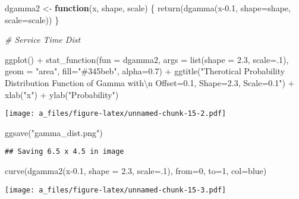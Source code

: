 \documentclass[
]{article}
\newenvironment{Shaded}{\begin{snugshade}}{\end{snugshade}}
\newcommand{\AttributeTok}[1]{\textcolor[rgb]{0.77,0.63,0.00}{#1}}
\newcommand{\CommentTok}[1]{\textcolor[rgb]{0.56,0.35,0.01}{\textit{#1}}}
\newcommand{\ControlFlowTok}[1]{\textcolor[rgb]{0.13,0.29,0.53}{\textbf{#1}}}
\newcommand{\DecValTok}[1]{\textcolor[rgb]{0.00,0.00,0.81}{#1}}
\newcommand{\FloatTok}[1]{\textcolor[rgb]{0.00,0.00,0.81}{#1}}
\newcommand{\FunctionTok}[1]{\textcolor[rgb]{0.00,0.00,0.00}{#1}}
\newcommand{\NormalTok}[1]{#1}
\newcommand{\OtherTok}[1]{\textcolor[rgb]{0.56,0.35,0.01}{#1}}
\newcommand{\SpecialCharTok}[1]{\textcolor[rgb]{0.00,0.00,0.00}{#1}}
\newcommand{\StringTok}[1]{\textcolor[rgb]{0.31,0.60,0.02}{#1}}
\begin{document}
\begin{Shaded}
\begin{Highlighting}[]
\NormalTok{dgamma2 }\OtherTok{\textless{}{-}} \ControlFlowTok{function}\NormalTok{(x, shape, scale) \{}
  \FunctionTok{return}\NormalTok{(}\FunctionTok{dgamma}\NormalTok{(x}\FloatTok{{-}0.1}\NormalTok{, }\AttributeTok{shape=}\NormalTok{shape, }\AttributeTok{scale=}\NormalTok{scale))}
\NormalTok{\}}

\CommentTok{\# Service Time Dist}

\FunctionTok{ggplot}\NormalTok{() }\SpecialCharTok{+}
  \FunctionTok{stat\_function}\NormalTok{(}\AttributeTok{fun =}\NormalTok{ dgamma2,}
                \AttributeTok{args =} \FunctionTok{list}\NormalTok{(}\AttributeTok{shape =} \FloatTok{2.3}\NormalTok{, }\AttributeTok{scale=}\NormalTok{.}\DecValTok{1}\NormalTok{),}
                \AttributeTok{geom =} \StringTok{"area"}\NormalTok{,}
                \AttributeTok{fill=}\StringTok{"\#345beb"}\NormalTok{, }\AttributeTok{alpha=}\FloatTok{0.7}\NormalTok{) }\SpecialCharTok{+}
  \FunctionTok{ggtitle}\NormalTok{(}\StringTok{"Therotical Probability Distribution Function of Gamma with}\SpecialCharTok{\textbackslash{}n}\StringTok{ Offset=0.1, Shape=2.3, Scale=0.1"}\NormalTok{) }\SpecialCharTok{+}
  \FunctionTok{xlab}\NormalTok{(}\StringTok{"x"}\NormalTok{) }\SpecialCharTok{+}
  \FunctionTok{ylab}\NormalTok{(}\StringTok{"Probability"}\NormalTok{)}
\end{Highlighting}
\end{Shaded}

\texttt{[image: a\_files/figure-latex/unnamed-chunk-15-2.pdf]}

\begin{Shaded}
\begin{Highlighting}[]
\FunctionTok{ggsave}\NormalTok{(}\StringTok{"gamma\_dist.png"}\NormalTok{)}
\end{Highlighting}
\end{Shaded}

\begin{verbatim}
## Saving 6.5 x 4.5 in image
\end{verbatim}

\begin{Shaded}
\begin{Highlighting}[]
\FunctionTok{curve}\NormalTok{(}\FunctionTok{dgamma2}\NormalTok{(x}\FloatTok{{-}0.1}\NormalTok{, }\AttributeTok{shape =} \FloatTok{2.3}\NormalTok{, }\AttributeTok{scale=}\NormalTok{.}\DecValTok{1}\NormalTok{), }\AttributeTok{from=}\DecValTok{0}\NormalTok{, }\AttributeTok{to=}\DecValTok{1}\NormalTok{, }\AttributeTok{col=}\StringTok{\textquotesingle{}blue\textquotesingle{}}\NormalTok{) }
\end{Highlighting}
\end{Shaded}

\texttt{[image: a\_files/figure-latex/unnamed-chunk-15-3.pdf]}
\end{document}
